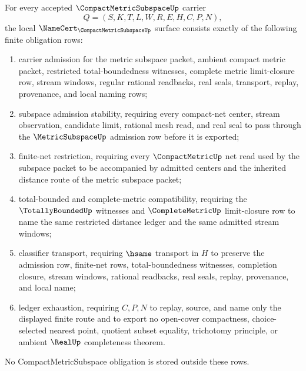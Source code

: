 \begin{theorem}
\label{thm:compact-metric-subspace-namecert-obligations}
For every accepted $\CompactMetricSubspaceUp$ carrier
$$
Q=(S,K,T,L,W,R,E,H,C,P,N),
$$
the local $\NameCert_{\CompactMetricSubspaceUp}$ surface consists exactly of the following finite obligation rows:
\begin{enumerate}
\item carrier admission for the metric subspace packet, ambient compact metric packet, restricted total-boundedness witnesses, complete metric limit-closure row, stream windows, regular rational readbacks, real seals, transport, replay, provenance, and local naming rows;
\item subspace admission stability, requiring every compact-net center, stream observation, candidate limit, rational mesh read, and real seal to pass through the $\MetricSubspaceUp$ admission row before it is exported;
\item finite-net restriction, requiring every $\CompactMetricUp$ net read used by the subspace packet to be accompanied by admitted centers and the inherited distance route of the metric subspace packet;
\item total-bounded and complete-metric compatibility, requiring the $\TotallyBoundedUp$ witnesses and $\CompleteMetricUp$ limit-closure row to name the same restricted distance ledger and the same admitted stream windows;
\item classifier transport, requiring $\hsame$ transport in $H$ to preserve the admission row, finite-net rows, total-boundedness witnesses, completion closure, stream windows, rational readbacks, real seals, replay, provenance, and local name;
\item ledger exhaustion, requiring $C,P,N$ to replay, source, and name only the displayed finite route and to export no open-cover compactness, choice-selected nearest point, quotient subset equality, trichotomy principle, or ambient $\RealUp$ completeness theorem.
\end{enumerate}
No CompactMetricSubspace obligation is stored outside these rows.
\end{theorem}

